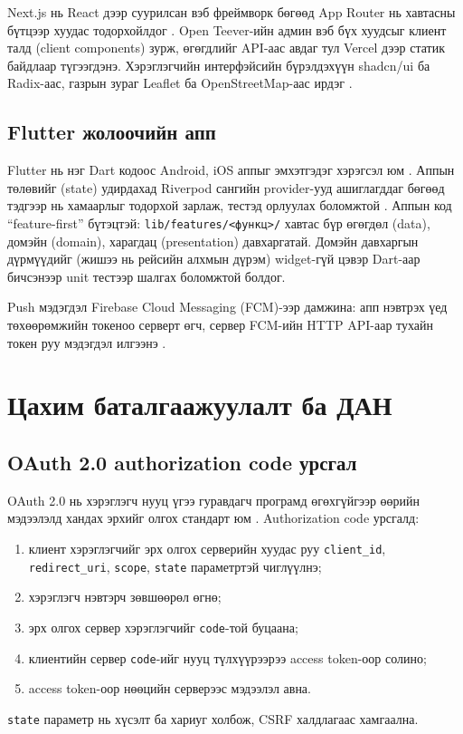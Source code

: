 \documentclass[
12pt,
oneside,
english,
onehalfspacing,
nolistspacing,
headsepline,
]{MUST-Thesis}
\begin{document}
Next.js нь React дээр суурилсан вэб фреймворк бөгөөд App Router нь хавтасны бүтцээр хуудас тодорхойлдог \cite{nextjsdocs}. Open Teever-ийн админ вэб бүх хуудсыг клиент талд (client components) зурж, өгөгдлийг API-аас авдаг тул Vercel дээр статик байдлаар түгээгдэнэ. Хэрэглэгчийн интерфэйсийн бүрэлдэхүүн shadcn/ui ба Radix-аас, газрын зураг Leaflet ба OpenStreetMap-аас ирдэг \cite{leafletdocs,osm}.

\subsection{Flutter жолоочийн апп}

Flutter нь нэг Dart кодоос Android, iOS аппыг эмхэтгэдэг хэрэгсэл юм \cite{flutterdocs}. Аппын төлөвийг (state) удирдахад Riverpod сангийн provider-ууд ашиглагддаг бөгөөд тэдгээр нь хамаарлыг тодорхой зарлаж, тестэд орлуулах боломжтой \cite{riverpoddocs}. Аппын код ``feature-first'' бүтэцтэй: \texttt{lib/features/<функц>/} хавтас бүр өгөгдөл (data), домэйн (domain), харагдац (presentation) давхаргатай. Домэйн давхаргын дүрмүүдийг (жишээ нь рейсийн алхмын дүрэм) widget-гүй цэвэр Dart-аар бичсэнээр unit тестээр шалгах боломжтой болдог.

Push мэдэгдэл Firebase Cloud Messaging (FCM)-ээр дамжина: апп нэвтрэх үед төхөөрөмжийн токеноо серверт өгч, сервер FCM-ийн HTTP API-аар тухайн токен руу мэдэгдэл илгээнэ \cite{fcmdocs}.

\section{Цахим баталгаажуулалт ба ДАН}

\subsection{OAuth 2.0 authorization code урсгал}

OAuth 2.0 нь хэрэглэгч нууц үгээ гуравдагч програмд өгөхгүйгээр өөрийн мэдээлэлд хандах эрхийг олгох стандарт юм \cite{rfc6749}. Authorization code урсгалд:
\begin{enumerate}
    \item клиент хэрэглэгчийг эрх олгох серверийн хуудас руу \texttt{client\_id}, \texttt{redirect\_uri}, \texttt{scope}, \texttt{state} параметртэй чиглүүлнэ;
    \item хэрэглэгч нэвтэрч зөвшөөрөл өгнө;
    \item эрх олгох сервер хэрэглэгчийг \texttt{code}-той буцаана;
    \item клиентийн сервер \texttt{code}-ийг нууц түлхүүрээрээ access token-оор солино;
    \item access token-оор нөөцийн серверээс мэдээлэл авна.
\end{enumerate}
\texttt{state} параметр нь хүсэлт ба хариуг холбож, CSRF халдлагаас хамгаална.
\end{document}
